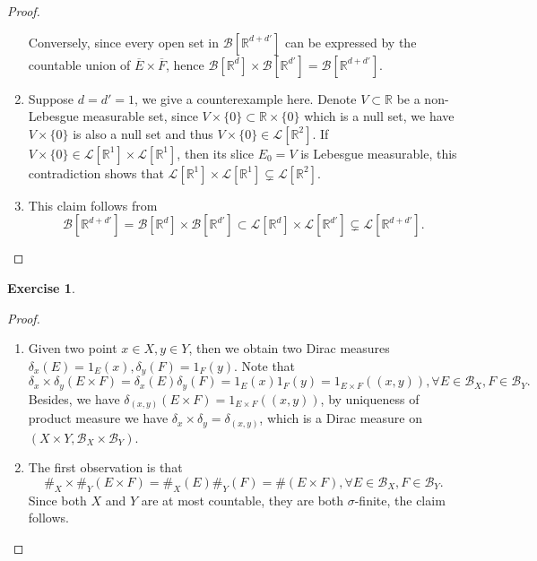 \documentclass[a4paper]{article}
\newtheorem{ex}{Exercise}[subsection]
\begin{document}
\begin{proof}
\begin{enumerate}[label = (\roman*)]
    Conversely, since every open set in $\mathcal{B}[\mathbb{R}^{d + d'}]$ can be expressed by the countable union of
    $\overline{E} \times \overline{F}$, hence $\mathcal{B}[\mathbb{R}^d] \times \mathcal{B}[\mathbb{R}^{d'}] = \mathcal{B}[\mathbb{R}^{d + d'}]$.
    \item Suppose $d = d' = 1$, we give a counterexample here. Denote $V \subset \mathbb{R}$ be a non-Lebesgue measurable set, 
    since $V \times \{0\} \subset \mathbb{R} \times \{0\}$ which is a null set, we have $V \times \{0\}$ is also a null set 
    and thus $V \times \{0\} \in \mathcal{L}[\mathbb{R}^2]$. If $V \times \{0\} \in \mathcal{L}[\mathbb{R}^1] \times \mathcal{L}[\mathbb{R}^1]$,
    then its slice $E_0 = V$ is Lebesgue measurable, this contradiction shows that $\mathcal{L}[\mathbb{R}^1] \times \mathcal{L}[\mathbb{R}^1] \subsetneq \mathcal{L}[\mathbb{R}^2]$.
    \item This claim follows from $$
    \mathcal{B}[\mathbb{R}^{d + d'}] = \mathcal{B}[\mathbb{R}^d] \times \mathcal{B}[\mathbb{R}^{d'}] \subset \mathcal{L}[\mathbb{R}^d]
    \times \mathcal{L}[\mathbb{R}^{d'}] \subsetneq \mathcal{L}[\mathbb{R}^{d + d'}].
    $$
    
\end{enumerate}
\end{proof}

\begin{ex}\end{ex}\begin{proof}\ \begin{enumerate}[label = (\roman*)]
    \item Given two point $x \in X, y \in Y$, then we obtain two Dirac measures $\delta_x(E) = 1_E(x), \delta_y(F) = 1_F(y)$.
    Note that $$
    \delta_x \times \delta_y(E \times F) = \delta_x(E)\delta_y(F) = 1_E(x)1_F(y) = 1_{E \times F}((x, y)), \forall 
    E \in \mathcal{B}_X, F \in \mathcal{B}_Y.
    $$Besides, we have $\delta_{(x, y)}(E \times F) = 1_{E \times F}((x, y))$, by uniqueness of product measure
    we have $\delta_x \times \delta_y = \delta_{(x, y)}$, which is a Dirac measure on $(X \times Y, \mathcal{B}_X \times \mathcal{B}_Y)$.
    \item The first observation is that $$
    \#_X \times \#_Y(E \times F) = \#_X(E)\#_Y(F) = \#(E \times F), \forall E \in \mathcal{B}_X, F \in \mathcal{B}_Y.
    $$Since both $X$ and $Y$ are at most countable, they are both $\sigma$-finite, the claim follows.
\end{enumerate}
\end{proof}
\end{document}
